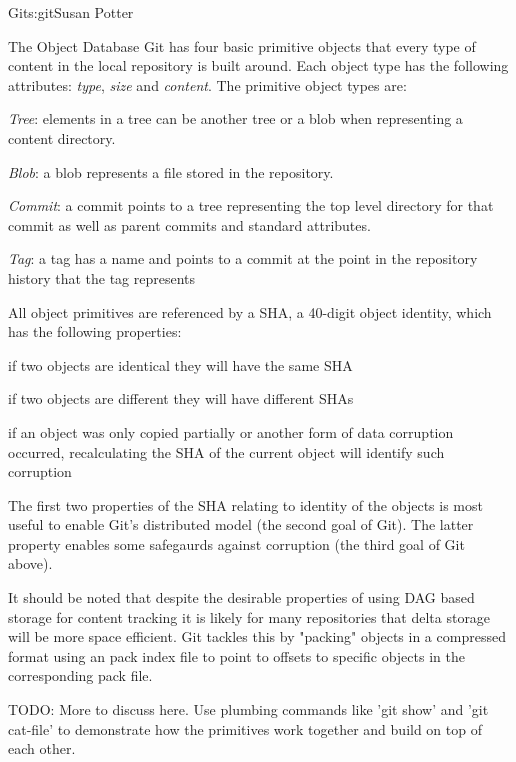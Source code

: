 \begin{aosachapter}{Git}{s:git}{Susan Potter}
\begin{aosasect1}{The Object Database}
Git has four basic primitive objects that every type of content in the
local repository is built around. Each object type has the following
attributes: \emph{type}, \emph{size} and \emph{content}. The primitive object
types are:
\begin{aosaitemize}
  \item \emph{Tree}: elements in a tree can be another tree or a blob when
  representing a content directory.
  \item \emph{Blob}: a blob represents a file stored in the repository.
  \item \emph{Commit}: a commit points to a tree representing the top level
  directory for that commit as well as parent commits and standard
  attributes.
  \item \emph{Tag}: a tag has a name and points to a commit at the point in
  the repository history that the tag represents
\end{aosaitemize}

All object primitives are referenced by a SHA, a 40-digit object identity,
which has the following properties:
\begin{aosaitemize}
  \item if two objects are identical they will have the same SHA
  \item if two objects are different they will have different SHAs
  \item if an object was only copied partially or another form of data
        corruption occurred, recalculating the SHA of the current object
        will identify such corruption
\end{aosaitemize}

The first two properties of the SHA relating to identity of the objects is
most useful to enable Git's distributed model (the second goal of Git).
The latter property enables some safegaurds against corruption (the third
goal of Git above).

It should be noted that despite the desirable properties of using DAG based
storage for content tracking it is likely for many repositories that delta
storage will be more space efficient. Git tackles this by "packing" objects
in a compressed format using an pack index file to point to offsets to
specific objects in the corresponding pack file.

TODO: More to discuss here. Use plumbing commands like 'git show' and 'git
cat-file' to demonstrate how the primitives work together and build on top of
each other.

\end{aosasect1}


\end{aosachapter}
